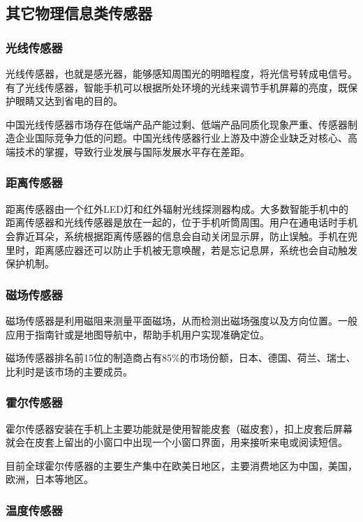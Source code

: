 \documentclass[a4paper,11pt,onecolumn,twoside]{article}
\begin{document}
\begin{multicols}{2}
\subsection{其它物理信息类传感器}

\subsubsection{光线传感器}

光线传感器，也就是感光器，能够感知周围光的明暗程度，将光信号转成电信号。有了光线传感器，智能手机可以根据所处环境的光线来调节手机屏幕的亮度，既保护眼睛又达到省电的目的。\cite{TraditionalUsageOfSendor}

中国光线传感器市场存在低端产品产能过剩、低端产品同质化现象严重、传感器制造企业国际竞争力低的问题。中国光线传感器行业上游及中游企业缺乏对核心、高端技术的掌握，导致行业发展与国际发展水平存在差距。

\subsubsection{距离传感器}

距离传感器由一个红外LED灯和红外辐射光线探测器构成。大多数智能手机中的距离传感器和光线传感器是放在一起的，位于手机听筒周围。用户在通电话时手机会靠近耳朵，系统根据距离传感器的信息会自动关闭显示屏，防止误触。手机在兜里时，距离感应器还可以防止手机被无意唤醒，若是忘记息屏，系统也会自动触发保护机制。

\subsubsection{磁场传感器}

磁场传感器是利用磁阻来测量平面磁场，从而检测出磁场强度以及方向位置。一般应用于指南针或是地图导航中，帮助手机用户实现准确定位。

磁场传感器排名前15位的制造商占有85\%的市场份额，日本、德国、荷兰、瑞士、比利时是该市场的主要成员。

\subsubsection{霍尔传感器}

霍尔传感器安装在手机上主要功能就是使用智能皮套（磁皮套），扣上皮套后屏幕就会在皮套上留出的小窗口中出现一个小窗口界面，用来接听来电或阅读短信。

目前全球霍尔传感器的主要生产集中在欧美日地区，主要消费地区为中国，美国，欧洲，日本等地区。

\subsubsection{温度传感器}


\end{multicols}
\end{document}
